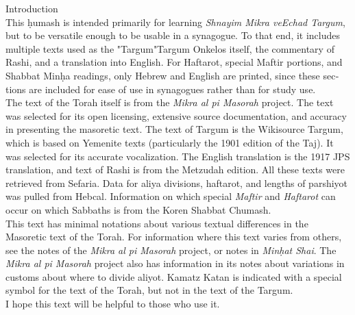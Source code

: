 \tableofcontents
\clearpage
{}	
\begin{minipage}{\textwidth}\englishfont
	
\begin{english}
\vspace{16pt}
\Large Introduction\vspace{12pt}\\
\normalsize
This \d{h}umash is intended primarily for learning \textit{Shnayim Mikra veEchad Targum}, but to be versatile enough to be usable in a synagogue. To that end, it includes multiple texts used as the "Targum"\textemdash Targum Onkelos itself, the commentary of Rashi, and a translation into English.  For Haftarot, special Maftir portions, and Shabbat Min\d{h}a readings, only Hebrew and English are printed, since these sections are included for ease of use in synagogues rather than for study use.\\

The text of the Torah itself is from the \textit{Mikra al pi Masorah} project. The text was selected for its open licensing, extensive source documentation, and accuracy in presenting the masoretic text.  The text of Targum is the Wikisource Targum, which is based on Yemenite texts (particularly the 1901 edition of the Taj). It was selected for its accurate vocalization.
The English translation is the 1917 JPS translation, and text of Rashi is from the Metzudah edition.  All these texts were retrieved from Sefaria. Data for aliya divisions, haftarot, and lengths of parshiyot was pulled from Hebcal. Information on which special \textit{Maftir} and \textit{Haftarot} can occur on which Sabbaths is from the Koren Shabbat Chumash.\\

This text has minimal notations about various textual differences in the Masoretic text of the Torah. For information where this text varies from others, see the notes of the \textit{Mikra al pi Masorah} project, or notes in \textit{Min\d{h}at Shai}. The \textit{Mikra al pi Masorah} project also has information in its notes about variations in customs about where to divide aliyot. Kamatz Katan is indicated with a special symbol for the text of the Torah, but not in the text of the Targum.\\

I hope this text will be helpful to those who use it.

\end{english}

\end{minipage}


